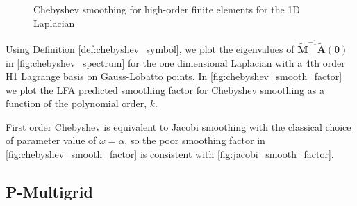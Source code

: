 \documentclass[review]{siamart190516}
\begin{document}
\begin{figure}[!tbp]
  \centering
  \hfill
  \caption{Chebyshev smoothing for high-order finite elements for the 1D Laplacian}
\end{figure}

Using Definition \ref{def:chebyshev_symbol}, we plot the eigenvalues of $\tilde{\mathbf{M}}^{-1} \tilde{\mathbf{A}} \left( \boldsymbol{\theta} \right)$ in \cref{fig:chebyshev_spectrum} for the one dimensional Laplacian with a 4th order H1 Lagrange basis on Gauss-Lobatto points.
In \cref{fig:chebyshev_smooth_factor} we plot the LFA predicted smoothing factor for Chebyshev smoothing as a function of the polynomial order, $k$.

First order Chebyshev is equivalent to Jacobi smoothing with the classical choice of parameter value of $\omega = \alpha$, so the poor smoothing factor in \cref{fig:chebyshev_smooth_factor} is consistent with \cref{fig:jacobi_smooth_factor}.

\subsection{P-Multigrid}\label{sec:multigrid}
\end{document}
